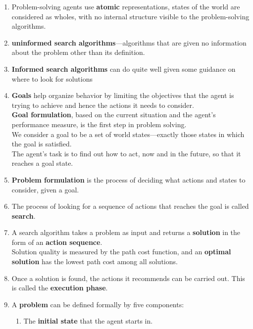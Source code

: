 \begin{enumerate}
    \item Problem-solving agents use \textbf{atomic} representations, states of the world are considered as wholes, with no internal structure visible to the problem-solving algorithms. 

    \item \textbf{uninformed search algorithms}—algorithms that are given no information about the problem other than its definition.

    \item \textbf{Informed search algorithms} can do quite well given some guidance on where to look for solutions

    \item \textbf{Goals} help organize behavior by limiting the objectives that the agent is trying to achieve and hence the actions it needs to consider.\\
    \textbf{Goal formulation}, based on the current situation and the agent’s performance measure, is the first step in problem solving.\\
    We consider a goal to be a set of world states—exactly those states in which the goal is satisfied.\\
    The agent’s task is to find out how to act, now and in the future, so that it reaches a goal state.

    \item  \textbf{Problem formulation} is the process of deciding what actions and states to consider, given a goal. 

    \item The process of looking for a sequence of actions that reaches the goal is called \textbf{search}.

    \item A search algorithm takes a problem as input and returns a \textbf{solution} in the form of an \textbf{action sequence}.\\
    Solution quality is measured by the path cost function, and an \textbf{optimal solution} has the lowest path cost among all solutions.

    \item Once a solution is found, the actions it recommends can be carried out. This is called the \textbf{execution phase}.

    \item A \textbf{problem} can be defined formally by five components:
    \begin{enumerate}
        \item The \textbf{initial state} that the agent starts in.


\end{enumerate}
\end{enumerate}
